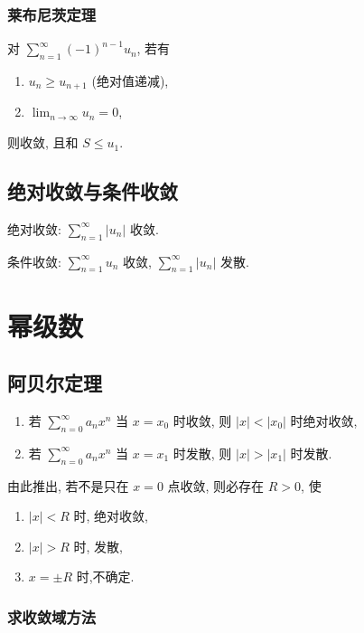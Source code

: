 \subsubsection{莱布尼茨定理}

对 $\sum_{n=1}^{\infty}(-1)^{n-1} u_{n}$, 若有

\begin{enumerate}
    \item $u_n \geq u_{n+1}$ (绝对值递减),
    \item $\lim _{n \rightarrow \infty} u_{n}=0$,
\end{enumerate}

则收敛, 且和 $S \leq u_1$.

\subsection{绝对收敛与条件收敛}

绝对收敛: $\sum_{n=1}^{\infty} |u_n|$ 收敛.

条件收敛: $\sum_{n=1}^{\infty} u_n$ 收敛, $\sum_{n=1}^{\infty} |u_n|$ 发散.

\section{幂级数}

\subsection{阿贝尔定理}

\begin{enumerate}
    \item 若 $\sum_{n=0}^{\infty} a_nx^n$ 当 $x=x_0$ 时收敛, 则 $|x| < |x_0|$ 时绝对收敛,
    \item 若 $\sum_{n=0}^{\infty} a_nx^n$ 当 $x=x_1$ 时发散, 则 $|x| > |x_1|$ 时发散.
\end{enumerate}

由此推出, 若不是只在 $x=0$ 点收敛, 则必存在 $R>0$, 使

\begin{enumerate}
    \item $|x|<R$ 时, 绝对收敛,
    \item $|x|>R$ 时, 发散,
    \item $x=\pm R$ 时,不确定.
\end{enumerate}

\subsubsection{求收敛域方法}

